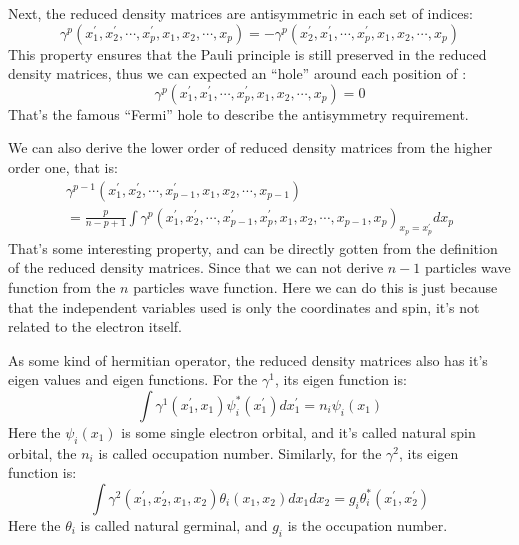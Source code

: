 Next, the reduced density matrices are antisymmetric in each set of
indices:
\begin{equation}\label{}
  \gamma^{p}(x^{'}_{1}, x^{'}_{2}, \cdots, x^{'}_{p}, x_{1}, x_{2},
  \cdots, x_{p}) = -\gamma^{p}(x^{'}_{2}, x^{'}_{1},  \cdots,
  x^{'}_{p}, x_{1}, x_{2}, \cdots, x_{p})
\end{equation}
This property ensures that the Pauli principle is still preserved in
the reduced density matrices, thus we can expected an ``hole''
around each position of :
\begin{equation}\label{}
  \gamma^{p}(x^{'}_{1}, x^{'}_{1}, \cdots, x^{'}_{p}, x_{1}, x_{2},
  \cdots, x_{p}) = 0
\end{equation}
That's the famous ``Fermi'' hole to describe the antisymmetry
requirement.

We can also derive the lower order of reduced density matrices from
the higher order one, that is:
\begin{multline}\label{}
  \gamma^{p-1}(x^{'}_{1}, x^{'}_{2}, \cdots, x^{'}_{p-1}, x_{1},
  x_{2},
  \cdots, x_{p-1}) \\
  = \frac{p}{n-p+1}\int \gamma^{p}(x^{'}_{1}, x^{'}_{2}, \cdots,
  x^{'}_{p-1}, x^{'}_{p},
  x_{1}, x_{2}, \cdots, x_{p-1}, x_{p})_{x_{p}=x^{'}_{p}}
  dx_{p}
\end{multline}
That's some interesting property, and can be directly gotten from
the definition of the reduced density matrices. Since that we can
not derive $n-1$ particles wave function from the $n$ particles wave
function. Here we can do this is just because that the independent
variables used is only the coordinates and spin, it's not related to
the electron itself.

As some kind of hermitian operator, the reduced density matrices
also has it's eigen values and eigen functions. For the
$\gamma^{1}$, its eigen function is:
\begin{equation}\label{}
  \int \gamma^{1}(x^{'}_{1},x_{1})\psi^{*}_{i}(x^{'}_{1})dx^{'}_{1} =
  n_{i}\psi_{i}(x_{1})
\end{equation}
Here the $\psi_{i}(x_{1})$ is some single electron orbital, and it's
called natural spin orbital, the $n_{i}$ is called occupation
number. Similarly, for the $\gamma^{2}$, its eigen function is:
\begin{equation}\label{}
  \int \gamma^{2}(x^{'}_{1},x^{'}_{2}, x_{1},
  x_{2})\theta_{i}(x_{1},x_{2})dx_{1}dx_{2} =
  g_{i}\theta^{*}_{i}(x^{'}_{1}, x^{'}_{2})
\end{equation}
Here the $\theta_{i}$ is called natural germinal, and $g_{i}$ is the
occupation number.

